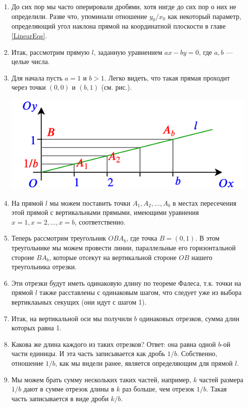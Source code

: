 \begin{enumerate}
\item До сих пор мы часто оперировали дробями, хотя нигде до сих пор о них не определили. Разве что, упоминали отношение $y_0/x_0$ как некоторый параметр, определяющий угол наклона прямой на координатной плоскости в главе \ref{LinearEqs}.
\item Итак, рассмотрим прямую $l$, заданную уравнением $ax-by=0$, где $a,b$ --- целые числа.
\item Для начала пусть $a=1$ и $b>1$. Легко видеть, что такая прямая проходит через точки $(0,0)$ и $(b,1)$ (см. рис.).
\begin{center}
\includegraphics[scale=0.5]{section.png}
\end{center}
\item На прямой $l$ мы можем поставить точки $A_1, A_2, \dots, A_b$ в местах пересечения этой прямой с вертикальными прямыми, имеющими уравнения $x=1, x=2, \dots, x=b$, соответственно.
\item Теперь рассмотрим треугольник $OBA_b$, где точка $B=(0,1)$. В этом треугольнике мы можем провести линии, параллельные его горизонтальной стороне $BA_b$, которые отсекут на вертикальной стороне $OB$ нашего треугольника отрезки.
\item Эти отрезки будут иметь одинаковую длину по теореме Фалеса, т.к. точки на прямой $l$ также расставлены с одинаковым шагом, что следует уже из выбора вертиклаьных секущих (они идут с шагом 1).
\item Итак, на вертикальной оси мы получили $b$ одинаковых отрезков, сумма длин которых равна 1.
\item Какова же длина каждого из таких отрезков? Ответ: она равна одной $b$-ой части единицы. И эта часть записывается как дробь $1/b$. Собственно, отношение $1/b$, как мы видели ранее, является определяющим для прямой $l$.
\item Мы можем брать сумму нескольких таких частей, например, $k$ частей размера $1/b$ дают в сумме отрезок длины в $k$ раз больше, чем отрезок $1/b$. Такая часть записывается в виде дроби $k/b$.

\end{enumerate}
